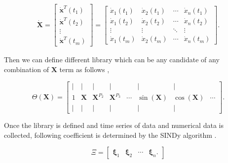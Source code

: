 \documentclass[review]{elsarticle}
\begin{document}
\begin{linenomath}
\begin{equation}
	\begin{gathered}
		\dot{\mathbf{X}}=\left[\begin{array}{c}
			\dot{\mathbf{x}}^T\left(t_1\right) \\
			\dot{\mathbf{x}}^T\left(t_2\right) \\
			\vdots \\
			\dot{\mathbf{x}}^T\left(t_m\right)
		\end{array}\right]=\left[\begin{array}{cccc}
			\dot{x}_1\left(t_1\right) & \dot{x}_2\left(t_1\right) & \cdots & \dot{x}_n\left(t_1\right) \\
			\dot{x}_1\left(t_2\right) & \dot{x}_2\left(t_2\right) & \cdots & \dot{x}_n\left(t_2\right) \\
			\vdots & \vdots & \ddots & \vdots \\
			\dot{x}_1\left(t_m\right) & \dot{x}_2\left(t_m\right) & \cdots & \dot{x}_n\left(t_m\right)
		\end{array}\right] .
	\end{gathered}
\end{equation}
\end{linenomath}
Then we can define different library which can be any candidate of any combination of $\mathbf{X}$ term as follows \cite{brunton2017discovering},
\begin{linenomath}
	\begin{equation}
		\Theta(\mathbf{X})=\left[\begin{array}{cccccccc}
			\mid & \mid & \mid & \mid & & \mid & \mid & \\
			1 & \mathbf{X} & \mathbf{X}^{P_2} & \mathbf{X}^{P_3} & \cdots & \sin (\mathbf{X}) & \cos (\mathbf{X}) & \cdots \\
			\mid & \mid & \mid & \mid & & \mid & \mid &
		\end{array}\right] .
	\end{equation}
\end{linenomath}
Once the library is defined and time series of data and numerical data is collected, following coefficient is determined by the SINDy algorithm \cite{brunton2017discovering}. 
\begin{linenomath}
\begin{equation}
	\Xi=\left[\begin{array}{llll}
		\boldsymbol{\xi}_1 & \boldsymbol{\xi}_2 & \cdots & \boldsymbol{\xi}_n.
	\end{array}\right]
\end{equation}
\end{linenomath}
\end{document}
